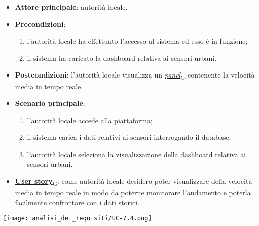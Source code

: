 \begin{itemize}
	\item \textbf{Attore principale}: autorità locale.
	\item \textbf{Precondizioni}:
	      \begin{enumerate}
		      \item l'autorità locale ha effettuato l'accesso al sistema ed esso è in funzione;
		      \item il sistema ha caricato la dashboard relativa ai sensori urbani.
	      \end{enumerate}
	\item \textbf{Postcondizioni}: l'autorità locale visualizza un \href{https://7last.github.io/docs/pb/documentazione-interna/glossario\#panel}{\textit{panel}\textsubscript{G}} contenente la velocità media in tempo reale.
	\item \textbf{Scenario principale}:
	      \begin{enumerate}
		      \item l'autorità locale accede alla piattaforma;
		      \item il sistema carica i dati relativi ai sensori interrogando il database;
		      \item l'autorità locale seleziona la visualizzazione della dashboard relativa ai sensori urbani.
	      \end{enumerate}
	\item \href{https://7last.github.io/docs/pb/documentazione-interna/glossario\#user-story}{\textbf{User story}\textsubscript{G}}:
	      come autorità locale desidero poter visualizzare della velocità media in tempo reale in modo da poterne monitorare l'andamento
	      e poterla facilmente confrontare con i dati storici.
\end{itemize}
\begin{center}
	\texttt{[image: analisi\_dei\_requisiti/UC-7.4.png]}
\end{center}


